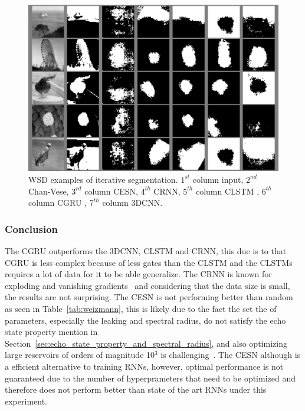 \documentclass{WitsPhysicsReport}
\begin{document}
\begin{figure}[H]
\centering
  \includegraphics[width=1\textwidth]{Figure/Results/WEIZMANN_sample.png}
 \caption{WSD examples of iterative segmentation. $1^{st}$ column input, $2^{nd}$ Chan-Vese, $3^{rd}$ column CESN, $4^{th}$ CRNN, $5^{th}$ column CLSTM , $6^{th}$ column CGRU , $7^{th}$ column 3DCNN.}
 \label{fig:sample_results_weizamann}
\end{figure}


\subsubsection{Conclusion}

The CGRU outperforms the 3DCNN, CLSTM and CRNN, this due is to that CGRU is less complex because of less gates than the CLSTM and the CLSTMs requires a lot of data for it to be able generalize. The CRNN is known for exploding and vanishing gradients~\cite{pascanu2013difficulty} and considering that the data size is small, the results are not surprising. The CESN is not performing better than random as seen in Table~\ref{tab:weizmann}, this is likely due to the fact the set the of parameters, especially the leaking and spectral radius, do not satisfy the echo state property mention in Section~\ref{sec:echo_state_property_and_spectral_radius}, and also optimizing  large reservoirs of orders of magnitude 10$^3$ is challenging~\cite{jaeger2001echo}. The CESN although is a efficient alternative to training RNNs, however, optimal performance is not guaranteed due to the number of hyperprameters that need to be optimized and therefore does not perform better than state of the art RNNs under this experiment.
\end{document}
